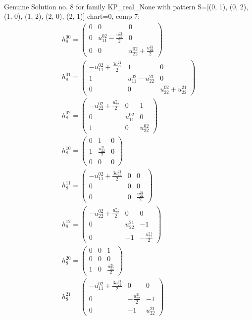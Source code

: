 \documentclass[a4paper, 11pt, twoside, onecolumn]{article}
\begin{document}
\begin{landscape}
\begin{gather*}
\end{gather*} 
Genuine Solution no. 8 for family KP_real_None with pattern S=[(0, 1), (0, 2), (1, 0), (1, 2), (2, 0), (2, 1)] chart=0, comp 7: 
\begin{gather*} 
	 h_{8}^{00}=\begin{pmatrix}0 & 0 & 0\\0 & u^{02}_{11} - \frac{u^{21}_{22}}{2} & 0\\0 & 0 & u^{02}_{22} + \frac{u^{21}_{22}}{2}\end{pmatrix}\\ 
	 h_{8}^{01}=\begin{pmatrix}- u^{02}_{11} + \frac{3 u^{21}_{22}}{2} & 1 & 0\\1 & u^{02}_{11} - u^{21}_{22} & 0\\0 & 0 & u^{02}_{22} + u^{21}_{22}\end{pmatrix}\\ 
	 h_{8}^{02}=\begin{pmatrix}- u^{02}_{22} + \frac{u^{21}_{22}}{2} & 0 & 1\\0 & u^{02}_{11} & 0\\1 & 0 & u^{02}_{22}\end{pmatrix}\\ 
	 h_{8}^{10}=\begin{pmatrix}0 & 1 & 0\\1 & \frac{u^{21}_{22}}{2} & 0\\0 & 0 & 0\end{pmatrix}\\ 
	 h_{8}^{11}=\begin{pmatrix}- u^{02}_{11} + \frac{3 u^{21}_{22}}{2} & 0 & 0\\0 & 0 & 0\\0 & 0 & \frac{u^{21}_{22}}{2}\end{pmatrix}\\ 
	 h_{8}^{12}=\begin{pmatrix}- u^{02}_{22} + \frac{u^{21}_{22}}{2} & 0 & 0\\0 & u^{21}_{22} & -1\\0 & -1 & - \frac{u^{21}_{22}}{2}\end{pmatrix}\\ 
	 h_{8}^{20}=\begin{pmatrix}0 & 0 & 1\\0 & 0 & 0\\1 & 0 & \frac{u^{21}_{22}}{2}\end{pmatrix}\\ 
	 h_{8}^{21}=\begin{pmatrix}- u^{02}_{11} + \frac{3 u^{21}_{22}}{2} & 0 & 0\\0 & - \frac{u^{21}_{22}}{2} & -1\\0 & -1 & u^{21}_{22}\end{pmatrix}\\ 

\end{gather*}
\end{landscape}
\end{document}
